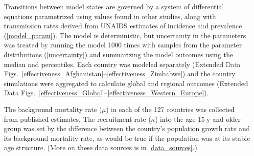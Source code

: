 \documentclass{article}
\begin{document}
Transitions between model states are governed by a system of
differential equations parametrized using values found in other
studies, along with transmission rates derived from UNAIDS estimates
of incidence and prevalence (\autoref{model_param}).  The model is
deterministic, but uncertainty in the parameters was treated by
running the model 1000 times with samples from the parameter
distributions (\autoref{uncertainty}) and summarizing the model
outcomes using the median and percentiles.  Each country was modeled
separately (Extended Data
Figs.~\ref*{effectiveness_Afghanistan}--\ref*{effectiveness_Zimbabwe})
and the country simulations were aggregated to calculate global and
regional outcomes (Extended Data
Figs.~\ref*{effectiveness_Global}--\ref*{effectiveness_Western_Europe}).

The background mortality rate ($\mu$) in each of the 127 countries was
collected from published
estimates\cite{World_Development_Indicators2013-ee}.  The recruitment
rate ($\kappa$) into the age $15\;\text{y}$ and older group was set by
the difference between the country's population growth
rate\cite{WorldBankpg} and its background mortality
rate\cite{World_Development_Indicators2013-ee}, as would be true if
the population was at its stable age structure.  (More on these data
sources is in \autoref{data_sources}.)
\end{document}
